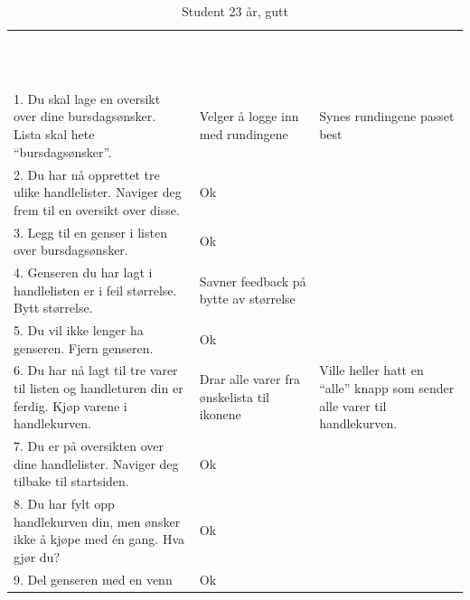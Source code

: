 \begin{table}[H]
    \caption{Student 23 år, gutt}
    \label{tab:observasjon2_1}
    \centering
    \begin{tabular}{|L{15em}  L{15em} L{15em}|}
    \hline
        \textbf{\textcolor{white}{Task}} & \textbf{\textcolor{white}{Obeservation during execution}} & \textbf{\textcolor{white}{Conversation and discussion}}\\
        1. Du skal lage en oversikt over dine bursdagsønsker. Lista skal hete “bursdagsønsker”. & Velger å logge inn med rundingene          & Synes rundingene passet best\\
        2. Du har nå opprettet tre ulike handlelister. Naviger deg frem til en oversikt over disse. & Ok & \\
        3. Legg til en genser i listen over bursdagsønsker. & Ok & \\ 
        4. Genseren du har lagt i handlelisten er i feil størrelse. Bytt størrelse. & Savner feedback på bytte av størrelse & \\
        5. Du vil ikke lenger ha genseren. Fjern genseren. & Ok & \\
        6. Du har nå lagt til tre varer til listen og handleturen din er ferdig. Kjøp varene i handlekurven. & Drar alle varer fra ønskelista til ikonene & Ville heller hatt en “alle” knapp som sender alle varer til handlekurven. \\
        7. Du er på oversikten over dine handlelister. Naviger deg tilbake til startsiden. & Ok & \\
        8. Du har fylt opp handlekurven din, men ønsker ikke å kjøpe med én gang. Hva gjør du? & Ok & \\
        9. Del genseren med en venn & Ok & \\
        \hline
    \end{tabular}
\end{table}

